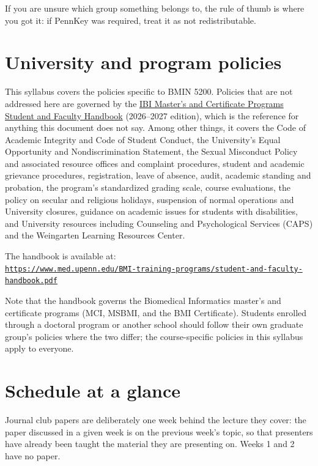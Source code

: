 \documentclass[11pt]{article}
\newcommand{\handbookurl}{https://www.med.upenn.edu/BMI-training-programs/student-and-faculty-handbook.pdf}
\begin{document}
If you are unsure which group something belongs to, the rule of thumb is where you got it: if
PennKey was required, treat it as not redistributable.

\section{University and program policies}

This syllabus covers the policies specific to BMIN 5200. Policies that are not addressed here are
governed by the \href{\handbookurl}{IBI Master's and Certificate Programs Student and Faculty
Handbook} (2026--2027 edition), which is the reference for anything this document does not say.
Among other things, it covers the Code of Academic Integrity and Code of Student Conduct, the
University's Equal Opportunity and Nondiscrimination Statement, the Sexual Misconduct Policy and
associated resource offices and complaint procedures, student and academic grievance procedures,
registration, leave of absence, audit, academic standing and probation, the program's
standardized grading scale, course evaluations, the policy on secular and religious holidays,
suspension of normal operations and University closures, guidance on academic issues for students
with disabilities, and University resources including Counseling and Psychological Services
(CAPS) and the Weingarten Learning Resources Center.

The handbook is available at:\\
\href{\handbookurl}{\texttt{\handbookurl}}

Note that the handbook governs the Biomedical Informatics master's and certificate programs (MCI,
MSBMI, and the BMI Certificate). Students enrolled through a doctoral program or another school
should follow their own graduate group's policies where the two differ; the course-specific
policies in this syllabus apply to everyone.

\section{Schedule at a glance}

Journal club papers are deliberately one week behind the lecture they cover: the paper discussed
in a given week is on the previous week's topic, so that presenters have already been taught the
material they are presenting on. Weeks 1 and 2 have no paper.
\end{document}
